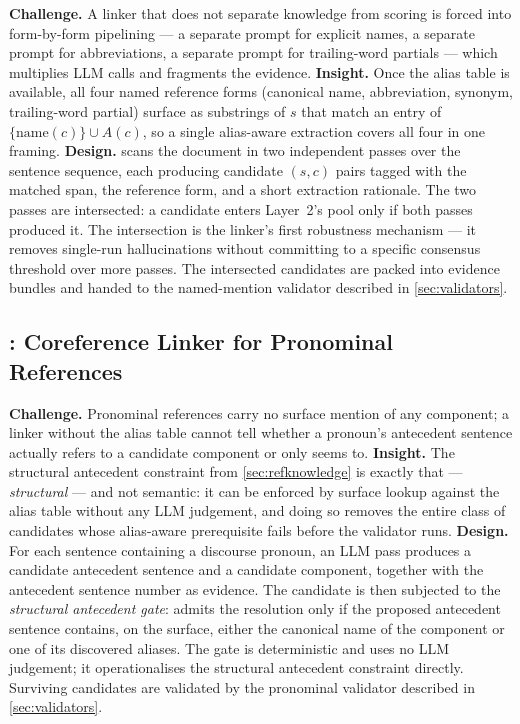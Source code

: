 \textbf{Challenge.} A linker that does not separate knowledge from scoring is forced into form-by-form pipelining --- a separate prompt for explicit names, a separate prompt for abbreviations, a separate prompt for trailing-word partials --- which multiplies \ac{LLM} calls and fragments the evidence.
\textbf{Insight.} Once the alias table is available, all four named reference forms (canonical name, abbreviation, synonym, trailing-word partial) surface as substrings of $s$ that match an entry of $\{\mathrm{name}(c)\} \cup A(c)$, so a single alias-aware extraction covers all four in one framing.
\textbf{Design.} \linkerB scans the document in two independent passes over the sentence sequence, each producing candidate $(s, c)$ pairs tagged with the matched span, the reference form, and a short extraction rationale.
The two passes are intersected: a candidate enters Layer~2's pool only if both passes produced it.
The intersection is the linker's first robustness mechanism --- it removes single-run hallucinations without committing to a specific consensus threshold over more passes.
The intersected candidates are packed into evidence bundles and handed to the named-mention validator described in \autoref{sec:validators}.

\subsection{\linkerC: Coreference Linker for Pronominal References}\label{sec:coref-linker}

\textbf{Challenge.} Pronominal references carry no surface mention of any component; a linker without the alias table cannot tell whether a pronoun's antecedent sentence actually refers to a candidate component or only seems to.
\textbf{Insight.} The structural antecedent constraint from \autoref{sec:refknowledge} is exactly that --- \emph{structural} --- and not semantic: it can be enforced by surface lookup against the alias table without any \ac{LLM} judgement, and doing so removes the entire class of candidates whose alias-aware prerequisite fails before the validator runs.
\textbf{Design.} For each sentence containing a discourse pronoun, an \ac{LLM} pass produces a candidate antecedent sentence and a candidate component, together with the antecedent sentence number as evidence.
The candidate is then subjected to the \emph{structural antecedent gate}: \approach admits the resolution only if the proposed antecedent sentence contains, on the surface, either the canonical name of the component or one of its discovered aliases.
The gate is deterministic and uses no \ac{LLM} judgement; it operationalises the structural antecedent constraint directly.
Surviving candidates are validated by the pronominal validator described in \autoref{sec:validators}.

